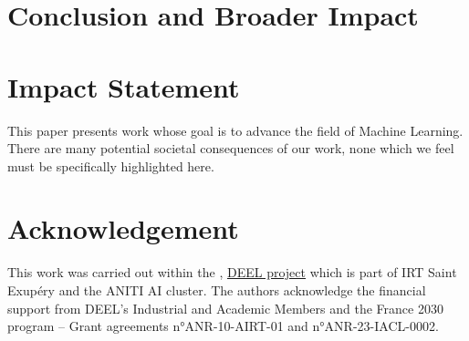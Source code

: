 \documentclass{article}
\begin{document}

    \label{sec:eval}


\section{Conclusion and Broader Impact}

    \label{sec:conclusions}

\section*{Impact Statement}

This paper presents work whose goal is to advance the field of Machine Learning. There are many potential societal consequences of our work, none which we feel must be specifically highlighted here.

\section*{Acknowledgement}
This work was carried out within the , \href{https://www.deel.ai/}{DEEL project} which is part of IRT Saint Exupéry and the ANITI AI cluster. The authors acknowledge the financial support from DEEL's Industrial and Academic Members and the France 2030 program – Grant agreements n°ANR-10-AIRT-01 and n°ANR-23-IACL-0002.
    
% 
% 
% 





% 
\newpage


\appendix

\newpage



% 
\end{document}
